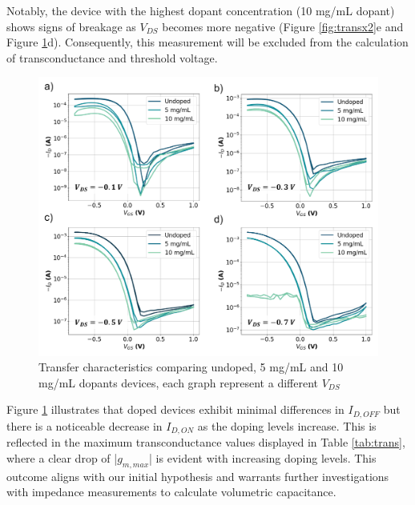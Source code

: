 Notably, the device with the highest dopant concentration (10 mg/mL dopant) shows signs of breakage as $V_{DS}$ becomes more negative (Figure \ref{fig:transx2}e and Figure \ref{fig:shift1}d). Consequently, this measurement will be excluded from the calculation of transconductance and threshold voltage.

\begin{figure}[ht]
    \centering
    \includegraphics[width=\textwidth]{Images/pdf/Trans_doping.pdf}
    \caption[Transfer characteristics comparing different doping levels]{Transfer characteristics comparing undoped, 5 mg/mL and 10 mg/mL dopants devices, each graph represent a different $V_{DS}$}
    \label{fig:shift1}
\end{figure}

Figure \ref{fig:shift1} illustrates that doped devices exhibit minimal differences in $I_{D,OFF}$ but  there is a noticeable decrease in $I_{D,ON}$ as the doping levels increase. This is reflected in the maximum transconductance values displayed in Table \ref{tab:trans}, where a clear drop of |$g_{m,max}$| is evident with increasing doping levels. This outcome aligns with our initial hypothesis and warrants further investigations with impedance measurements to calculate volumetric capacitance. %

